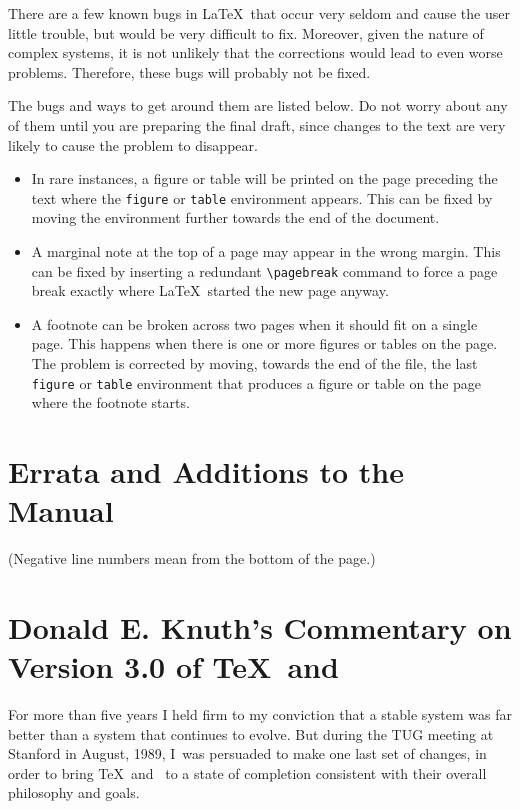 There are a few known bugs in \LaTeX\ that occur very seldom and
cause the user little trouble, but would be very difficult to fix.
Moreover, given the nature of complex systems, it is not unlikely that
the corrections would lead to even worse problems.  Therefore, these
bugs will probably not be fixed.

The bugs and ways to get around them are listed below.  Do not worry
about any of them until you are preparing the final draft, since
changes to the text are very likely to cause the problem to disappear.
\begin{itemize}
\item In rare instances, a figure or table will be printed on the page
preceding the text where the {\tt figure} or {\tt table} environment
appears.  This can be fixed by moving the environment further
towards the end of the document.

\item A marginal note at the top of a page may appear in the wrong
margin.  This can be fixed by inserting a redundant \verb|\pagebreak|
command to force a page break exactly where \LaTeX\ started the new
page anyway.

\item A footnote can be broken across two pages when it should fit on a
single page.  This happens when there is one or more figures or tables
on the page.  The problem is corrected by moving, towards the end of the
file, the last {\tt figure} or {\tt table} environment that produces a
figure or table on the page where the footnote starts.
\end{itemize}

\section{Errata and Additions to the Manual}

(Negative line numbers mean from the bottom of the page.)



\section{Donald E. Knuth's Commentary on Version 3.0 of \TeX\ and \MF}

For more than five years I held firm to my conviction that a stable system
was far better than a system that continues to evolve. But during the TUG
meeting at Stanford in August, 1989, I~was persuaded to make one last set of
changes, in order to bring \TeX\ and \MF\ to a state of completion consistent
with their overall philosophy and goals.


